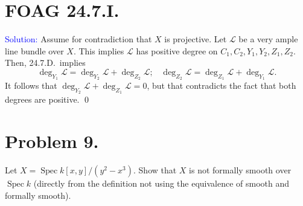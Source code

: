\documentclass[11pt]{article}
\newcommand{\cL}{\mathcal{L}}
\DeclareMathOperator{\Spec}{\operatorname{Spec}}
\newenvironment{solution}{\begin{trivlist}\item[]{\textcolor{blue}{Solution:}}}{\qed \end{trivlist}}
\begin{document}
\newpage

\section*{FOAG 24.7.I.}

\begin{solution}
    Assume for contradiction that $X$ is projective. Let $\cL$ be a very ample line bundle over $X$. This implies $\cL$ has positive degree on $C_1, C_2, Y_1, Y_2, Z_1, Z_2$. Then, 24.7.D.\ implies 
    \[
        \deg_{Y_1} \cL = \deg_{Y_2} \cL + \deg_{Z_2} \cL ; \hspace{10pt}
        \deg_{Z_2} \cL = \deg_{Z_1} \cL + \deg_{Y_1} \cL.
    \]
    It follows that $\deg_{Y_2} \cL + \deg_{Z_1} \cL = 0$, but that contradicts the fact that both degrees are positive. 
\end{solution}

\newpage

\section*{Problem 9.}

Let $X = \Spec k[x, y]/(y^2 - x^3)$. Show that $X$ is not formally smooth over $\Spec k$
(directly from the definition not using the equivalence of smooth and formally smooth).
\end{document}
